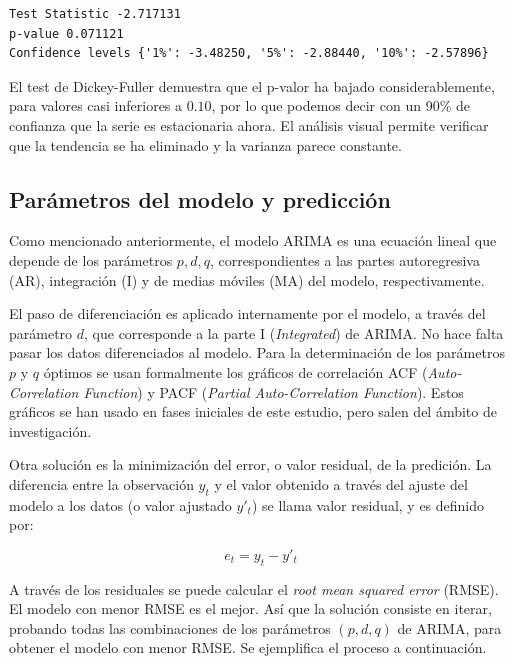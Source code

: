 \documentclass[11pt,spanish,listoffigures,listoftables]{tfgetsinf}
\begin{document}
    \begin{lstlisting}[caption=Resultados del test de Dickey-Fuller de {\tt statsmodels} de Python., label={lst:adf_test_2}]
Test Statistic -2.717131
p-value 0.071121
Confidence levels {'1%': -3.48250, '5%': -2.88440, '10%': -2.57896}
    \end{lstlisting}
    
    El test de Dickey-Fuller demuestra que el p-valor ha bajado considerablemente, para valores casi inferiores a \(0.10\), por lo que podemos decir con un 90\% de confianza que la serie es estacionaria ahora. El análisis visual permite verificar que la tendencia se ha eliminado y la varianza parece constante.
    
    \subsection{Parámetros del modelo y predicción}
    
    Como mencionado anteriormente, el modelo ARIMA es una ecuación lineal que depende de los parámetros \(p, d, q\), correspondientes a las partes autoregresiva (AR), integración (I) y de medias móviles (MA) del modelo, respectivamente. 
    
    El paso de diferenciación es aplicado internamente por el modelo, a través del parámetro \(d\), que corresponde a la parte I ({\em Integrated}) de ARIMA. No hace falta pasar los datos diferenciados al modelo. Para la determinación de los parámetros \(p\) y \(q\) óptimos se usan formalmente los gráficos de correlación ACF ({\em Auto-Correlation Function}) y PACF ({\em Partial Auto-Correlation Function}). Estos gráficos se han usado en fases iniciales de este estudio, pero salen del ámbito de investigación. 
    
    Otra solución es la minimización del error, o valor residual, de la predición. La diferencia entre la observación \(y_{t}\) y el valor obtenido a través del ajuste del modelo a los datos (o valor ajustado \(y'_{t}\)) se llama valor residual, y es definido por:
    
    \begin{equation}
    e_{t} = y_{t} - y'_{t}
    \end{equation}
    
    A través de los residuales se puede calcular el {\em root mean squared error} (RMSE). El modelo con menor RMSE es el mejor. Así que la solución consiste en iterar, probando todas las combinaciones de los parámetros \((p,d,q)\) de ARIMA, para obtener el modelo con menor RMSE. Se ejemplifica el proceso a continuación.
    
\end{document}
